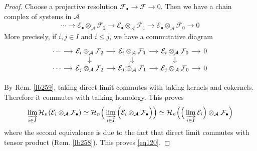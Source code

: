 \documentclass[12pt,b5paper,notitlepage]{report}
\theoremstyle{definition}
\theoremstyle{plain}
\newcommand{\mc}{\mathcal}
\newcommand{\blt}{\bullet}
\numberwithin{equation}{section}
\begin{document}
\begin{proof}
Choose a projective resolution $\mc F_\blt\rightarrow\mc F\rightarrow 0$. Then we have a chain complex of systems in $\mc A$
\begin{align*}
\cdots\rightarrow \mc E_\blt\otimes_{\mc A}\mc F_2\rightarrow \mc E_\blt\otimes_{\mc A}\mc F_1\rightarrow \mc E_\blt\otimes_{\mc A}\mc F_0\rightarrow0
\end{align*}
More precisely, if $i,j\in I$ and $i\leq j$, we have a commutative diagram
\begin{equation*}
\begin{tikzcd}[sep=small]
\cdots \arrow[r] & \mc E_i\otimes_{\mc A}\mc F_2 \arrow[r] \arrow[d] & \mc E_i\otimes_{\mc A}\mc F_1 \arrow[r] \arrow[d] & \mc E_i\otimes_{\mc A}\mc F_0 \arrow[r] \arrow[d] & 0 \\
\cdots \arrow[r] & \mc E_j\otimes_{\mc A}\mc F_2 \arrow[r]           & \mc E_j\otimes_{\mc A}\mc F_1 \arrow[r]           & \mc E_j\otimes_{\mc A}\mc F_0 \arrow[r]           & 0
\end{tikzcd}
\end{equation*}

By Rem. \ref{lb259}, taking direct limit commutes with taking kernels and cokernels. Therefore it commutes with talking homology. This proves
\begin{gather*}
\varinjlim_{i\in I}\mc H_n(\mc E_i\otimes_{\mc A}\mc F_\blt)\simeq\mc H_n\Big(\varinjlim_{i\in I}\Big(\mc E_i\otimes_{\mc A}\mc F_\blt\Big)\Big)\simeq\mc H_n\Big(\Big(\varinjlim_{i\in I}\mc E_i\Big)\otimes_{\mc A}\mc F_\blt\Big)
\end{gather*}
where the second equivalence is due to the fact that direct limit commutes with tensor product (Rem. \ref{lb258}). This proves \eqref{eq120}.
\end{proof}
\end{document}
